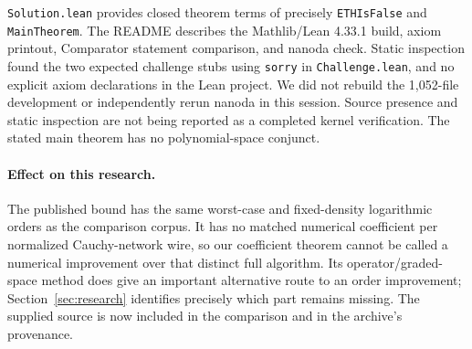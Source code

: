\texttt{Solution.lean} provides closed theorem terms of precisely
\texttt{ETHIsFalse} and \texttt{MainTheorem}. The README describes the
Mathlib/Lean 4.33.1 build, axiom printout, Comparator statement comparison,
and nanoda check. Static inspection found the two expected challenge stubs
using \texttt{sorry} in \texttt{Challenge.lean}, and no explicit axiom
declarations in the Lean project. We did not rebuild the 1,052-file development
or independently rerun nanoda in this session. Source presence and static
inspection are not being reported as a completed kernel verification.
The stated main theorem has no polynomial-space conjunct.

\paragraph{Effect on this research.}
The published bound has the same worst-case and fixed-density logarithmic
orders as the comparison corpus. It has no matched numerical coefficient per
normalized Cauchy-network wire, so our coefficient theorem cannot be called
a numerical improvement over that distinct full algorithm. Its
operator/graded-space method does give an important alternative route to an
order improvement; Section~\ref{sec:research} identifies precisely which
part remains missing. The supplied source is now included in the comparison
and in the archive's provenance.

